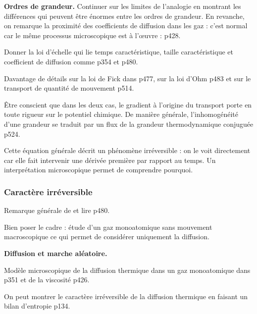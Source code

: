 \begin{slide}
\textbf{Ordres de grandeur.}
Continuer sur les limites de l'analogie en montrant les différences qui peuvent être énormes entre les ordres de grandeur.
En revanche, on remarque la proximité des coefficients de diffusion dans les gaz : c'est normal car le même processus microscopique est à l'œuvre : \cite{Olivier2000} p428.
\end{slide}

Donner la loi d'échelle qui lie temps caractéristique, taille caractéristique et coefficient de diffusion comme \cite{Olivier2000} p354 et \cite{Diu2008} p480.

\begin{remarque}
Davantage de détails sur la loi de Fick dans \cite{Diu2008} p477, sur la loi d'Ohm p483 et sur le transport de quantité de mouvement p514.

\noindent
Être conscient que dans les deux cas, le gradient à l'origine du transport porte en toute rigueur sur le potentiel chimique.
De manière générale, l'inhomogénéité d'une grandeur se traduit par un flux de la grandeur thermodynamique conjuguée \cite{Diu2008} p524.
\end{remarque}

\begin{transition}
Cette équation générale décrit un phénomène irréversible : on le voit directement car elle fait intervenir une dérivée première par rapport au temps.
Un interprétation microscopique permet de comprendre pourquoi.
\end{transition}

\subsubsection{Caractère irréversible}

Remarque générale de \cite{Olivier2000} et lire \cite{Diu2008} p480.

Bien poser le cadre : étude d'un gaz monoatomique sans mouvement macroscopique ce qui permet de considérer uniquement la diffusion.

\begin{slide}
\textbf{Diffusion et marche aléatoire.}
\end{slide}

\begin{remarque}
Modèle microscopique de la diffusion thermique dans un gaz monoatomique dans \cite{Olivier2000} p351 et de la viscosité p426.

\noindent
On peut montrer le caractère irréversible de la diffusion thermique en faisant un bilan d'entropie \cite{Sanz2016} p134.
\end{remarque}

